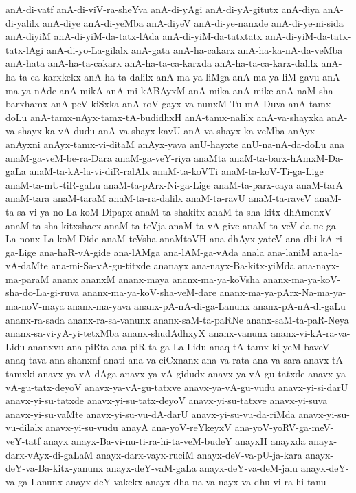 {anA-di-vatf
anA-di-viV-ra-sheYva
anA-di-yAgi
anA-di-yA-gitutx
anA-diya
anA-di-yalilx
anA-diye
anA-di-yeMba
anA-diyeV
anA-di-ye-nanxde
anA-di-ye-ni-sida
anA-diyiM
anA-di-yiM-da-tatx-lAda
anA-di-yiM-da-tatxtatx
anA-di-yiM-da-tatx-tatx-lAgi
anA-di-yo-La-gilalx
anA-gata
anA-ha-cakarx
anA-ha-ka-nA-da-veMba
anA-hata
anA-ha-ta-cakarx
anA-ha-ta-ca-karxda
anA-ha-ta-ca-karx-dalilx
anA-ha-ta-ca-karxkekx
anA-ha-ta-dalilx
anA-ma-ya-liMga
anA-ma-ya-liM-gavu
anA-ma-ya-nAde
anA-mikA
anA-mi-kABAyxM
anA-mika
anA-mike
anA-naM-sha-barxhamx
anA-peV-kiSxka
anA-roV-gayx-va-nunxM-Tu-mA-Duva
anA-tamx-doLu
anA-tamx-nAyx-tamx-tA-budidhxH
anA-tamx-nalilx
anA-va-shayxka
anA-va-shayx-ka-vA-dudu
anA-va-shayx-kavU
anA-va-shayx-ka-veMba
anAyx
anAyxni
anAyx-tamx-vi-ditaM
anAyx-yava
anU-hayxte
anU-na-nA-da-doLu
ana
anaM-ga-veM-be-ra-Dara
anaM-ga-veY-riya
anaMta
anaM-ta-barx-hAmxM-Da-gaLa
anaM-ta-kA-la-vi-diR-ralAlx
anaM-ta-koVTi
anaM-ta-koV-Ti-ga-Lige
anaM-ta-mU-tiR-gaLu
anaM-ta-pArx-Ni-ga-Lige
anaM-ta-parx-caya
anaM-tarA
anaM-tara
anaM-taraM
anaM-ta-ra-dalilx
anaM-ta-ravU
anaM-ta-raveV
anaM-ta-sa-vi-ya-no-La-koM-Dipapx
anaM-ta-shakitx
anaM-ta-sha-kitx-dhAmenxV
anaM-ta-sha-kitxshacx
anaM-ta-teVja
anaM-ta-vA-give
anaM-ta-veV-da-ne-ga-La-nonx-La-koM-Dide
anaM-teVsha
anaMtoVH
ana-dhAyx-yateV
ana-dhi-kA-ri-ga-Lige
ana-haR-vA-gide
ana-lAMga
ana-lAM-ga-vAda
anala
ana-laniM
ana-la-vA-daMte
ana-mi-Sa-vA-gu-titxde
ananayx
ana-nayx-Ba-kitx-yiMda
ana-nayx-ma-paraM
ananx
ananxM
ananx-maya
ananx-ma-ya-koVsha
ananx-ma-ya-koV-sha-do-La-gi-ruva
ananx-ma-ya-koV-sha-veM-dare
ananx-ma-ya-pArx-Na-ma-ya-ma-noV-maya
ananx-ma-yava
ananx-pA-nA-di-ga-Lanunx
ananx-pA-nA-di-gaLu
ananx-ra-sada
ananx-ra-sa-vanunx
ananx-saM-ta-paRNe
ananx-saM-ta-paR-Neya
ananx-sa-vi-yA-yi-tetxMba
ananx-shudAdhxyX
ananx-vanunx
ananx-vi-kA-ra-va-Lidu
ananxvu
ana-piRta
ana-piR-ta-ga-La-Lidu
anaq-tA-tamx-ki-yeM-baveV
anaq-tava
ana-shanxnf
anati
ana-va-ciCxnanx
ana-va-rata
ana-va-sara
anavx-tA-tamxki
anavx-ya-vA-dAga
anavx-ya-vA-gidudx
anavx-ya-vA-gu-tatxde
anavx-ya-vA-gu-tatx-deyoV
anavx-ya-vA-gu-tatxve
anavx-ya-vA-gu-vudu
anavx-yi-si-darU
anavx-yi-su-tatxde
anavx-yi-su-tatx-deyoV
anavx-yi-su-tatxve
anavx-yi-suva
anavx-yi-su-vaMte
anavx-yi-su-vu-dA-darU
anavx-yi-su-vu-da-riMda
anavx-yi-su-vu-dilalx
anavx-yi-su-vudu
anayA
ana-yoV-reYkeyxV
ana-yoV-yoRV-ga-meV-veY-tatf
anayx
anayx-Ba-vi-nu-ti-ra-hi-ta-veM-budeY
anayxH
anayxda
anayx-darx-vAyx-di-gaLaM
anayx-darx-vayx-ruciM
anayx-deV-va-pU-ja-kara
anayx-deY-va-Ba-kitx-yanunx
anayx-deY-vaM-gaLa
anayx-deY-va-deM-jalu
anayx-deY-va-ga-Lanunx
anayx-deY-vakekx
anayx-dha-na-va-nayx-va-dhu-vi-ra-hi-tanu
}
